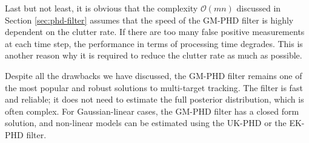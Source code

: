 Last but not least, it is obvious that the complexity $\mathcal{O}(mn)$ discussed in Section \ref{sec:phd-filter} assumes that the speed of the GM-PHD filter is highly dependent on the clutter rate. If there are too many false positive measurements at each time step, the performance in terms of processing time degrades. This is another reason why it is required to reduce the clutter rate as much as possible.

Despite all the drawbacks we have discussed, the GM-PHD filter remains one of the most popular and robust solutions to multi-target tracking. The filter is fast and reliable; it does not need to estimate the full posterior distribution, which is often complex. For Gaussian-linear cases, the GM-PHD filter has a closed form solution, and non-linear models can be estimated using the UK-PHD or the EK-PHD filter.
